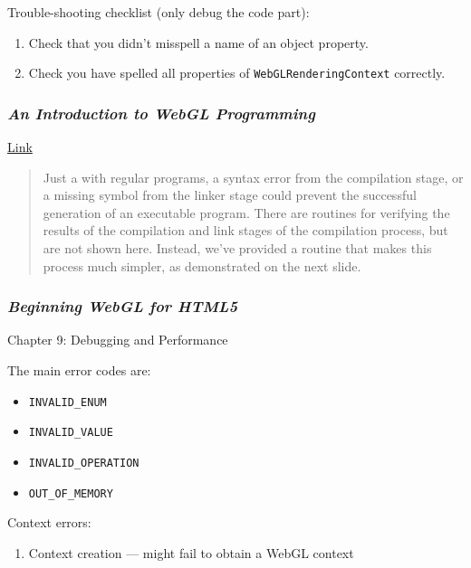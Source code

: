 \documentclass[]{article}
\begin{document}
Trouble-shooting checklist (only debug the code part):

\begin{enumerate}
\def\labelenumi{\arabic{enumi}.}
\itemsep1pt\parskip0pt
\item
  Check that you didn't misspell a name of an object property.
\item
  Check you have spelled all properties of
  \texttt{WebGLRenderingContext} correctly.
\end{enumerate}

\subsubsection{\emph{An Introduction to WebGL
Programming}}\label{an-introduction-to-webgl-programming}

\href{https://www.cs.unm.edu/~angel/SIGGRAPH14/Introduction\%20to\%20WebGL\%20Programming.pdf}{Link}

\begin{quote}
Just a with regular programs, a syntax error from the compilation stage,
or a missing symbol from the linker stage could prevent the successful
generation of an executable program. There are routines for verifying
the results of the compilation and link stages of the compilation
process, but are not shown here. Instead, we've provided a routine that
makes this process much simpler, as demonstrated on the next slide.
\end{quote}

\subsubsection{\emph{Beginning WebGL for
HTML5}}\label{beginning-webgl-for-html5}

Chapter 9: Debugging and Performance

The main error codes are:

\begin{itemize}
\itemsep1pt\parskip0pt
\item
  \texttt{INVALID\_ENUM}
\item
  \texttt{INVALID\_VALUE}
\item
  \texttt{INVALID\_OPERATION}
\item
  \texttt{OUT\_OF\_MEMORY}
\end{itemize}

Context errors:

\begin{enumerate}
\def\labelenumi{\arabic{enumi}.}
\itemsep1pt\parskip0pt
\item
  Context creation --- might fail to obtain a WebGL context
\end{enumerate}
\end{document}
